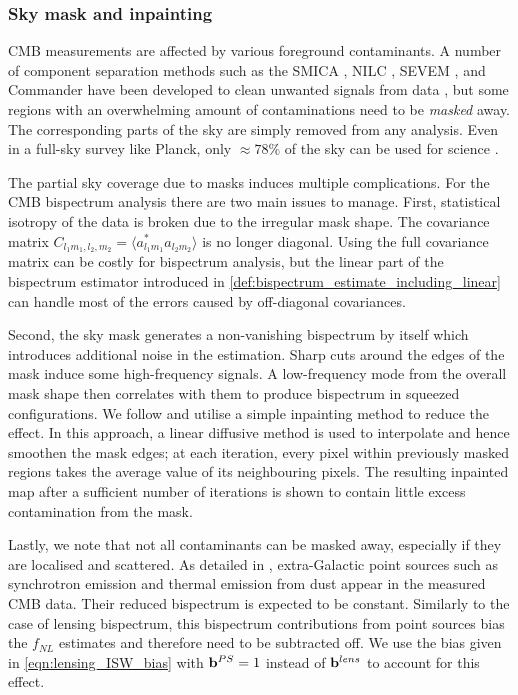 \subsubsection*{Sky mask and inpainting}

CMB measurements are affected by various foreground contaminants. A number of component separation methods such as the SMICA \cite{Cardoso2008component}, NILC \cite{Basak2012nilc}, SEVEM \cite{Martinez2003sevem}, and Commander \cite{Eriksen2008commander} have been developed to clean unwanted signals from data \cite{PlanckCollaboration2018component}, but some regions with an overwhelming amount of contaminations need to be \textit{masked} away. The corresponding parts of the sky are simply removed from any analysis. Even in a full-sky survey like Planck, only $\approx 78\%$ of the sky can be used for science \cite{PlanckCollaboration2018component}.

The partial sky coverage due to masks induces multiple complications. For the CMB bispectrum analysis there are two main issues to manage. First, statistical isotropy of the data is broken due to the irregular mask shape. The covariance matrix $C_{l_1 m_1, l_2, m_2} = \langle a^*_{l_1 m_1} a_{l_2 m_2} \rangle$ is no longer diagonal. Using the full covariance matrix can be costly for bispectrum analysis, but the linear part of the bispectrum estimator introduced in \eqref{def:bispectrum_estimate_including_linear} can handle most of the errors caused by off-diagonal covariances.

Second, the sky mask generates a non-vanishing bispectrum by itself which introduces additional noise in the estimation. Sharp cuts around the edges of the mask induce some high-frequency signals. A low-frequency mode from the overall mask shape then correlates with them to produce bispectrum in squeezed configurations. We follow \cite{Gruetjen2017inpainting} and utilise a simple inpainting method to reduce the effect. In this approach, a linear diffusive method is used to interpolate and hence smoothen the mask edges; at each iteration, every pixel within previously masked regions takes the average value of its neighbouring pixels. The resulting inpainted map after a sufficient number of iterations is shown to contain little excess contamination from the mask. 

Lastly, we note that not all contaminants can be masked away, especially if they are localised and scattered. As detailed in \cite{PlanckCollaboration2013}, extra-Galactic point sources such as synchrotron emission and thermal emission from dust appear in the measured CMB data. Their reduced bispectrum is expected to be constant. Similarly to the case of lensing bispectrum, this bispectrum contributions from point sources bias the $f_{NL}$ estimates and therefore need to be subtracted off. We use the bias given in \eqref{eqn:lensing_ISW_bias} with $\mathbf{b}^{PS}=1$ instead of $\mathbf{b}^{lens}$ to account for this effect.

